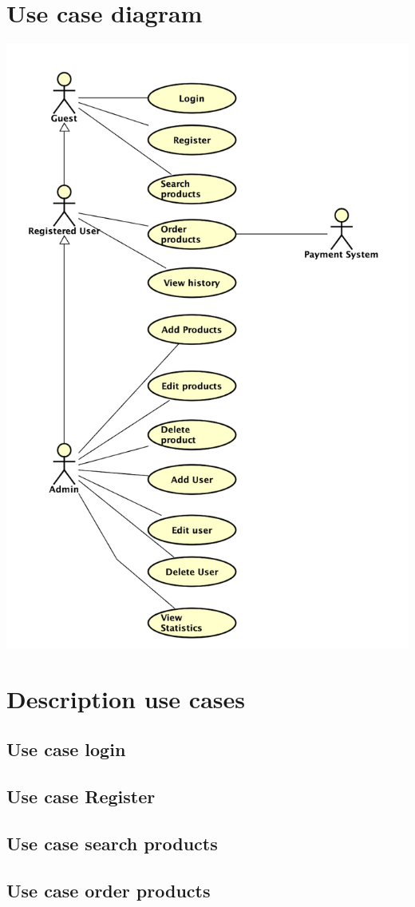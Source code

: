 \documentclass[titlepage, a4paper, 12pt]{article}
\begin{document}
\section{Use case diagram}
\includegraphics[width=0.80\linewidth]{images/use-case.png}

\section{Description use cases}
\subsection{Use case login}
\subsection{Use case Register}
\subsection{Use case search products}
\subsection{Use case order products}
\end{document}
